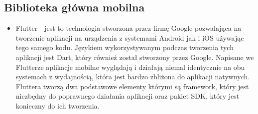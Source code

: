 \documentclass[a4paper,twoside,12pt]{book}
\begin{document}
\subsection{Biblioteka główna mobilna}
\begin{itemize}
    \item Flutter - jest to technologia stworzona przez firmę Google pozwalająca na tworzenie aplikacji na urządzenia z systemami Android jak i iOS używając tego samego kodu. Językiem wykorzystywanym podczas tworzenia tych aplikacji jest Dart, który również został stworzony przez Google. Napisane we Flutterze aplikacje mobilne wyglądają i działają niemal identycznie na obu systemach z wydajnością, która jest bardzo zbliżona do aplikacji natywnych. Fluttera tworzą dwa podstawowe elementy którymi są framework, który jest niezbędny do poprawnego działania aplikacji oraz pakiet SDK, który jest konieczny do ich tworzenia.
\end{itemize}
\end{document}
